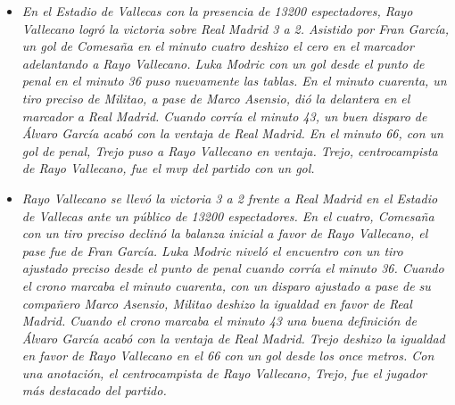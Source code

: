 \begin{itemize}
    \item \textit{En el Estadio de Vallecas con la presencia de 13200 espectadores, Rayo Vallecano logró la victoria sobre Real Madrid 3 a 2.
    Asistido por Fran García, un gol de Comesaña en el minuto cuatro deshizo el cero en el marcador adelantando a Rayo Vallecano. Luka Modric con un gol desde el punto de penal en el minuto 36 puso nuevamente las tablas. En el minuto cuarenta, un tiro preciso de Militao, a pase de Marco Asensio, dió la delantera en el marcador a Real Madrid. Cuando corría el minuto 43, un buen disparo de Álvaro García acabó con la ventaja de Real Madrid. En el minuto 66, con un gol de penal, Trejo puso a Rayo Vallecano en ventaja.
    Trejo, centrocampista de Rayo Vallecano, fue el mvp del partido con un gol.}
    \item \textit{Rayo Vallecano se llevó la victoria 3 a 2 frente a Real Madrid en el Estadio de Vallecas ante un público de 13200 espectadores.
    En el cuatro, Comesaña con un tiro preciso declinó la balanza inicial a favor de Rayo Vallecano, el pase fue de Fran García. Luka Modric niveló el encuentro con un tiro ajustado preciso desde el punto de penal cuando corría el minuto 36. Cuando el crono marcaba el minuto cuarenta, con un disparo ajustado a pase de su compañero Marco Asensio, Militao deshizo la igualdad en favor de Real Madrid. Cuando el crono marcaba el minuto 43 una buena definición de Álvaro García acabó con la ventaja de Real Madrid. Trejo deshizo la igualdad en favor de Rayo Vallecano en el 66 con un gol desde los once metros.
    Con una anotación, el centrocampista de Rayo Vallecano, Trejo, fue el jugador más destacado del partido.}
\end{itemize}

